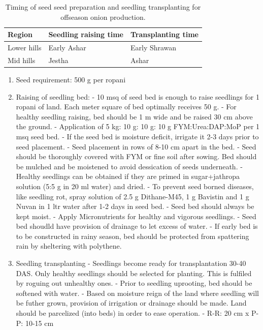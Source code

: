 \documentclass[
]{book}
\providecommand{\tightlist}{%
  \setlength{\itemsep}{0pt}\setlength{\parskip}{0pt}}
\begin{document}
\begin{table}

\caption{\label{tab:offseason-onion-seed-bed}Timing of seed seed preparation and seedling transplanting for offseason onion production.}
\centering
\fontsize{10}{12}\selectfont
\begin{tabular}[t]{lll}
\toprule
Region & Seedling raising time & Transplanting time\\
\midrule
Lower hills & Early Ashar & Early Shrawan\\
Mid hills & Jestha & Ashar\\
\bottomrule
\end{tabular}
\end{table}

\begin{enumerate}
\def\labelenumi{\arabic{enumi}.}
\setcounter{enumi}{3}
\tightlist
\item
  Seed requirement: 500 g per ropani
\item
  Raising of seedling bed:
  - 10 msq of seed bed is enough to raise seedlings for 1 ropani of land. Each meter square of bed optimally receives 50 g.
  - For healthy seedling raising, bed should be 1 m wide and be raised 30 cm above the ground.
  - Application of 5 kg: 10 g: 10 g: 10 g FYM:Urea:DAP:MoP per 1 msq seed bed.
  - If the seed bed is moisture deficit, irrigate it 2-3 days prior to seed placement.
  - Seed placement in rows of 8-10 cm apart in the bed.
  - Seed should be thoroughly covered with FYM or fine soil after sowing. Bed should be mulched and be moistened to avoid dessication of seeds underneath.
  - Healthy seedlings can be obtained if they are primed in sugar+jathropa solution (5:5 g in 20 ml water) and dried.
  - To prevent seed borned diseases, like seedling rot, spray solution of 2.5 g Dithane-M45, 1 g Bavistin and 1 g Nuvan in 1 ltr water after 1-2 days in seed bed.
  - Seed bed should always be kept moist.
  - Apply Micronutrients for healthy and vigorous seedlings.
  - Seed bed shoudld have provision of drainage to let excess of water.
  - If early bed is to be constructed in rainy season, bed should be protected from spattering rain by sheltering with polythene.
\item
  Seedling transplanting
  - Seedlings become ready for transplantation 30-40 DAS. Only healthy seedlings should be selected for planting. This is fulfiled by roguing out unhealthy ones.
  - Prior to seedling uprooting, bed should be softened with water.
  - Based on moisture reign of the land where seedling will be futher grown, provision of irrigation or drainage should be made. Land should be parcelized (into beds) in order to ease operation.
  - R-R: 20 cm x P-P: 10-15 cm
\end{enumerate}
\end{document}
